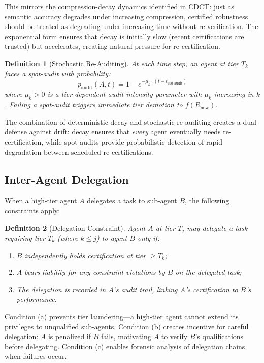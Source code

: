 \documentclass[11pt,a4paper]{article}
\newtheorem{definition}{Definition}
\begin{document}
This mirrors the compression-decay dynamics identified in CDCT: just as semantic accuracy degrades under increasing compression, certified robustness should be treated as degrading under increasing time without re-verification. The exponential form ensures that decay is initially slow (recent certifications are trusted) but accelerates, creating natural pressure for re-certification.

\begin{definition}[Stochastic Re-Auditing]
At each time step, an agent at tier $T_k$ faces a spot-audit with probability:
\begin{equation}
  p_{\text{audit}}(A, t) = 1 - e^{-\mu_k \cdot (t - t_{\text{last\_audit}})}
  \label{eq:audit_prob}
\end{equation}
where $\mu_k > 0$ is a tier-dependent audit intensity parameter with $\mu_k$ increasing in $k$. Failing a spot-audit triggers immediate tier demotion to $f(R_{\text{new}})$.
\end{definition}

The combination of deterministic decay and stochastic re-auditing creates a dual-defense against drift: decay ensures that \emph{every} agent eventually needs re-certification, while spot-audits provide probabilistic detection of rapid degradation between scheduled re-certifications.

\subsection{Inter-Agent Delegation}

When a high-tier agent $A$ delegates a task to sub-agent $B$, the following constraints apply:

\begin{definition}[Delegation Constraint]
Agent $A$ at tier $T_j$ may delegate a task requiring tier $T_k$ (where $k \leq j$) to agent $B$ only if:
\begin{enumerate}[nosep,label=(\alph*)]
  \item $B$ independently holds certification at tier $\geq T_k$;
  \item $A$ bears liability for any constraint violations by $B$ on the delegated task;
  \item The delegation is recorded in $A$'s audit trail, linking $A$'s certification to $B$'s performance.
\end{enumerate}
\end{definition}

Condition (a) prevents tier laundering---a high-tier agent cannot extend its privileges to unqualified sub-agents. Condition (b) creates incentive for careful delegation: $A$ is penalized if $B$ fails, motivating $A$ to verify $B$'s qualifications before delegating. Condition (c) enables forensic analysis of delegation chains when failures occur.
\end{document}
